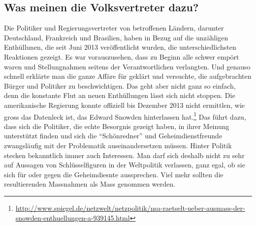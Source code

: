 \subsection{Was meinen die Volksvertreter dazu?}
Die Politiker und Regierungsvertreter von betroffenen Ländern, darunter Deutschland, Frankreich und Brasilien, haben in Bezug auf die unzähligen Enthüllunen, die seit Juni 2013 veröffentlicht wurden, die unterschiedlichsten Reaktionen gezeigt. Es war vorauszusehen, dass zu Beginn alle schwer empört waren und Stellungnahmen seitens der Verantwortlichen verlangten. Und genauso schnell erklärte man die ganze Affäre für geklärt und versuchte, die aufgebrachten Bürger und Politiker zu beschwichtigen. Das geht aber nicht ganz so einfach, denn die konstante Flut an neuen Enthüllungen lässt sich nicht stoppen. Die amerikanische Regierung konnte offiziell bis Dezember 2013 nicht ermittlen, wie gross das Datenleck ist, das Edward Snowden hinterlassen hat.\footnote{\url{http://www.spiegel.de/netzwelt/netzpolitik/nsa-raetselt-ueber-ausmass-der-snowden-enthuellungen-a-939145.html}}
Das führt dazu, dass sich die Politiker, die echte Besorgnis gezeigt haben, in ihrer Meinung unterstützt finden und sich die ``Schönredner'' und Geheimdienstfreunde zwangsläufig mit der Problematik auseinandersetzen müssen.
Hinter Politik stecken bekanntlich immer auch Interessen. Man darf sich deshalb nicht zu sehr auf Aussagen von Schlüsselfiguren in der Weltpolitik verlassen, ganz egal, ob sie sich für oder gegen die Geheimdiesnte aussprechen. Viel mehr sollten die resultierenden Massnahmen als Mass genommen werden.

